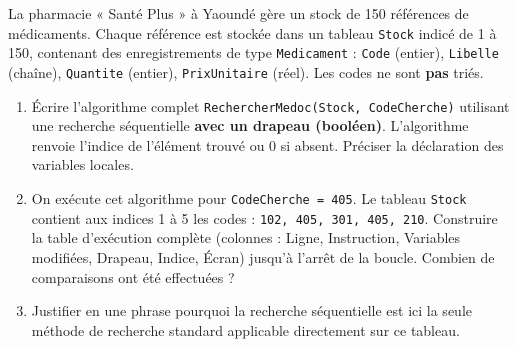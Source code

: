 \documentclass[11pt]{article}
\begin{document}
\begin{exercice}
La pharmacie « Santé Plus » à Yaoundé gère un stock de \num{150} références de médicaments. Chaque référence est stockée dans un tableau \texttt{Stock} indicé de 1 à 150, contenant des enregistrements de type \texttt{Medicament} : \texttt{Code} (entier), \texttt{Libelle} (chaîne), \texttt{Quantite} (entier), \texttt{PrixUnitaire} (réel). Les codes ne sont \textbf{pas} triés.

\begin{enumerate}
    \item Écrire l'algorithme complet \texttt{RechercherMedoc(Stock, CodeCherche)} utilisant une recherche séquentielle \textbf{avec un drapeau (booléen)}. L'algorithme renvoie l'indice de l'élément trouvé ou 0 si absent. Préciser la déclaration des variables locales.
    \item On exécute cet algorithme pour \texttt{CodeCherche = 405}. Le tableau \texttt{Stock} contient aux indices 1 à 5 les codes : \texttt{102, 405, 301, 405, 210}. Construire la table d'exécution complète (colonnes : Ligne, Instruction, Variables modifiées, Drapeau, Indice, Écran) jusqu'à l'arrêt de la boucle. Combien de comparaisons ont été effectuées ?
    \item Justifier en une phrase pourquoi la recherche séquentielle est ici la seule méthode de recherche standard applicable directement sur ce tableau.
\end{enumerate}
\end{exercice}
\end{document}
